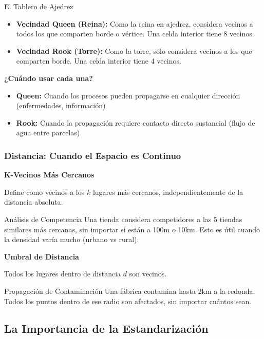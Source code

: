 \documentclass[12pt,a4paper]{article}
\begin{document}
\begin{analogia}{El Tablero de Ajedrez}
\begin{itemize}
    \item \textbf{Vecindad Queen (Reina):} Como la reina en ajedrez, considera vecinos a todos los que comparten borde o vértice. Una celda interior tiene 8 vecinos.
    \item \textbf{Vecindad Rook (Torre):} Como la torre, solo considera vecinos a los que comparten borde. Una celda interior tiene 4 vecinos.
\end{itemize}
\end{analogia}

\textbf{¿Cuándo usar cada una?}

\begin{itemize}
    \item \textbf{Queen:} Cuando los procesos pueden propagarse en cualquier dirección (enfermedades, información)
    \item \textbf{Rook:} Cuando la propagación requiere contacto directo sustancial (flujo de agua entre parcelas)
\end{itemize}

\subsubsection{Distancia: Cuando el Espacio es Continuo}

\textbf{K-Vecinos Más Cercanos}

Define como vecinos a los $k$ lugares más cercanos, independientemente de la distancia absoluta.

\begin{ejemplo}{Análisis de Competencia}
Una tienda considera competidores a las 5 tiendas similares más cercanas, sin importar si están a 100m o 10km. Esto es útil cuando la densidad varía mucho (urbano vs rural).
\end{ejemplo}

\textbf{Umbral de Distancia}

Todos los lugares dentro de distancia $d$ son vecinos.

\begin{ejemplo}{Propagación de Contaminación}
Una fábrica contamina hasta 2km a la redonda. Todos los puntos dentro de ese radio son afectados, sin importar cuántos sean.
\end{ejemplo}

\subsection{La Importancia de la Estandarización}
\end{document}

